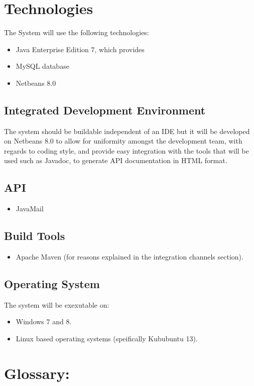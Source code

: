 \documentclass[12pt]{article}
\begin{document}
\section{Technologies}
The System will use the following technologies:
\begin{itemize}
\item Java Enterprise Edition 7, which provides 
\item MySQL database
\item Netbeans 8.0
\end{itemize}

\subsection*{Integrated Development Environment}
The system should be buildable independent of an IDE but it will be developed on Netbeans 8.0 to allow for uniformity amongst the development team, with regards to coding style, and provide easy integration with the tools that will be used such as Javadoc, to generate  API documentation in HTML format.

\subsection*{API}
\begin{itemize}
\item JavaMail
\end{itemize}

\subsection*{Build Tools}
\begin{itemize}
\item Apache Maven (for reasons explained in the integration channels section).
\end{itemize}

\subsection*{Operating System}
The system will be exexutable on:
\begin{itemize}
\item Windows 7 and 8.
\item Linux based operating systems (speifically Kububuntu 13).
\end{itemize}
\newpage

\section{Glossary:} %
\vspace{0.2in}
\end{document}
